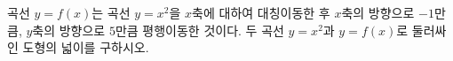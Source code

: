 곡선 $y=f(x)$는 곡선 $y=x^2$을 $x$축에 대하여 대칭이동한 후 $x$축의 방향으로 $-1$만큼, $y$축의 방향으로 $5$만큼 평행이동한 것이다. 두 곡선 $y=x^2$과 $y=f(x)$로 둘러싸인 도형의 넓이를 구하시오.
